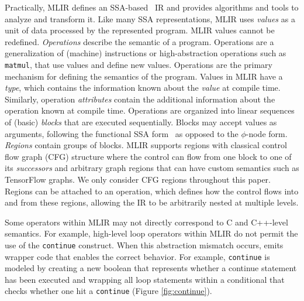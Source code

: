 
Practically, MLIR defines an SSA-based~\cite{ssa} IR and provides algorithms and tools to analyze and transform it.
Like many SSA representations, MLIR uses \emph{values} as a unit of data processed by the represented program.
MLIR values cannot be redefined. \emph{Operations} describe the semantic of a program. Operations are a generalization of (machine) instructions or high-abstraction operations such as \texttt{matmul}, that use values and define new values.
Operations are the primary mechanism for defining the semantics of the program.
Values in MLIR have a \emph{type}, which contains the information known about the \emph{value} at compile time.
Similarly, operation \emph{attributes} contain the additional information about the operation known at compile time.
Operations are organized into linear sequences of (basic) \emph{blocks} that are executed sequentially.
Blocks may accept values as arguments, following the functional SSA form~\cite{appel1998ssa} as opposed to the $\phi$-node form.
\emph{Regions} contain groups of blocks.
MLIR supports regions with classical control flow graph (CFG) structure where the control can flow from one block to one of its \emph{successors} and arbitrary graph regions that can have custom semantics such as TensorFlow graphs.
We only consider CFG regions throughout this paper.
Regions can be attached to an operation, which defines how the control flows into and from these regions, allowing the IR to be arbitrarily nested at multiple levels.


Some operators within MLIR may not directly correspond to C and C++-level semantics. For example, high-level loop operators within MLIR do not permit the use of the \texttt{continue} construct. When this abstraction mismatch occurs, \tool emits wrapper code that enables the correct behavior. For example, \texttt{continue} is modeled by creating a new boolean that represents whether a continue statement has been executed and wrapping all loop statements within a conditional that checks whether one hit a \texttt{continue} (Figure \ref{fig:continue}).

